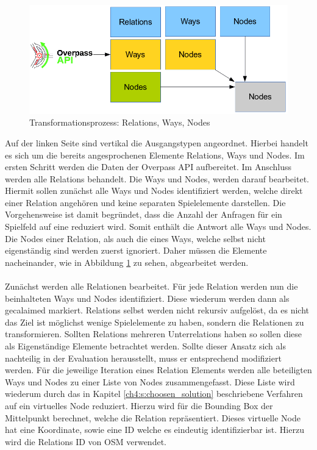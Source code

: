 \begin{figure}[H]
\begin{center}
\includegraphics[width=140mm]{images/ch5_img02_transform.png}
\caption{Transformationsprozess: Relations, Ways, Nodes}
\label{img:ch5_img02_transform}
\end{center}
\end{figure}

Auf der linken Seite sind vertikal die Ausgangstypen angeordnet. Hierbei handelt es sich um die bereits angesprochenen Elemente Relations, Ways und Nodes. Im ersten Schritt werden die Daten der Overpass API aufbereitet. Im Anschluss werden alle Relations behandelt. Die Ways und Nodes, werden darauf bearbeitet. Hiermit sollen zunächst alle Ways und Nodes identifiziert werden, welche direkt einer Relation angehören und keine separaten Spielelemente darstellen. Die Vorgehensweise ist damit begründet, dass die Anzahl der Anfragen für ein Spielfeld auf eine reduziert wird. Somit enthält die Antwort alle Ways und Nodes. Die Nodes einer Relation, als auch die eines Ways, welche selbst nicht eigenständig sind werden zuerst ignoriert. Daher müssen die Elemente nacheinander, wie in Abbildung \ref{img:ch5_img02_transform} zu sehen, abgearbeitet werden.
\\\\
Zunächst werden alle Relationen bearbeitet. Für jede Relation werden nun die beinhalteten Ways und Nodes identifiziert. Diese wiederum werden dann als \glqq gecalaimed\grqq{} markiert. Relations selbst werden nicht rekursiv aufgelöst, da es nicht das Ziel ist möglichst wenige Spielelemente zu haben, sondern die Relationen zu transformieren. Sollten Relations mehreren Unterrelations haben so sollen diese als Eigenständige Elemente betrachtet werden. Sollte dieser Ansatz sich als nachteilig in der Evaluation herausstellt, muss er entsprechend modifiziert werden.
Für die jeweilige Iteration eines Relation Elements werden  alle beteiligten Ways und Nodes zu einer Liste von Nodes zusammengefasst. Diese Liste wird wiederum durch das in Kapitel \ref{ch4:s:choosen_solution} beschriebene Verfahren auf ein virtuelles Node reduziert. Hierzu wird für die Bounding Box der Mittelpunkt berechnet, welche die Relation repräsentiert. Dieses virtuelle Node hat eine Koordinate, sowie eine ID welche es eindeutig identifizierbar ist. Hierzu wird die Relations ID von OSM verwendet.

